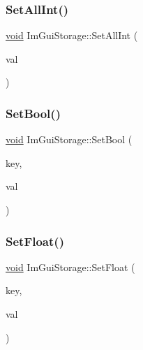 \mbox{\label{structImGuiStorage_ae5ee60618c4ce8e2b4ce0e5543d52992}} 
\subsubsection{\texorpdfstring{Set\+All\+Int()}{SetAllInt()}}
{\footnotesize\ttfamily \hyperlink{imgui__impl__opengl3__loader_8h_ac668e7cffd9e2e9cfee428b9b2f34fa7}{void} Im\+Gui\+Storage\+::\+Set\+All\+Int (\begin{DoxyParamCaption}\item[{int}]{val }\end{DoxyParamCaption})}

\mbox{\label{structImGuiStorage_ac5beee31a59b3f5294b41992717be7bf}} 
\subsubsection{\texorpdfstring{Set\+Bool()}{SetBool()}}
{\footnotesize\ttfamily \hyperlink{imgui__impl__opengl3__loader_8h_ac668e7cffd9e2e9cfee428b9b2f34fa7}{void} Im\+Gui\+Storage\+::\+Set\+Bool (\begin{DoxyParamCaption}\item[{Im\+Gui\+ID}]{key,  }\item[{bool}]{val }\end{DoxyParamCaption})}

\mbox{\label{structImGuiStorage_ab531d90a0e5a1a2453e351c499149756}} 
\subsubsection{\texorpdfstring{Set\+Float()}{SetFloat()}}
{\footnotesize\ttfamily \hyperlink{imgui__impl__opengl3__loader_8h_ac668e7cffd9e2e9cfee428b9b2f34fa7}{void} Im\+Gui\+Storage\+::\+Set\+Float (\begin{DoxyParamCaption}\item[{Im\+Gui\+ID}]{key,  }\item[{float}]{val }\end{DoxyParamCaption})}

